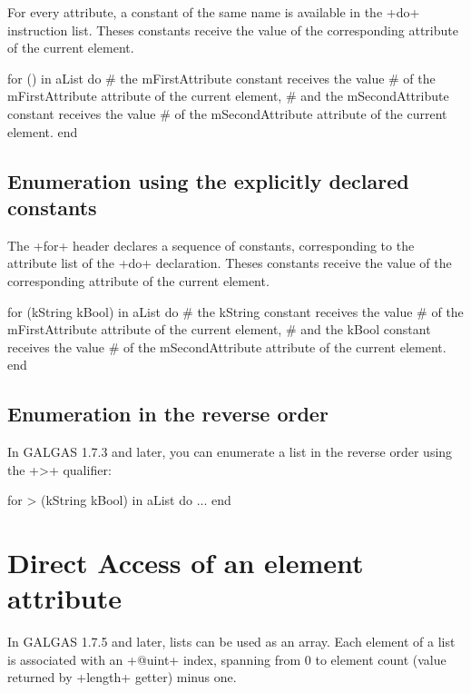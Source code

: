 For every attribute, a constant of the same name is available in the \ggs+do+ instruction list. Theses constants receive the value of the corresponding attribute of the current element.

\begin{galgas}
for () in aList do
  # the mFirstAttribute constant receives the value
  # of the mFirstAttribute attribute of the current element,
  # and the mSecondAttribute constant receives the value
  # of the mSecondAttribute attribute of the current element.
end
\end{galgas}

\subsection{Enumeration using the explicitly declared constants}

The \ggs+for+ header declares a sequence of constants, corresponding to the attribute list of the \ggs+do+ declaration. Theses constants receive the value of the corresponding attribute of the current element.


\begin{galgas}
for (kString kBool) in aList do
  # the kString constant receives the value
  # of the mFirstAttribute attribute of the current element,
  # and the kBool constant receives the value
  # of the mSecondAttribute attribute of the current element.
end
\end{galgas}

\subsection{Enumeration in the reverse order}

In GALGAS 1.7.3 and later, you can enumerate a list in the reverse order using the \ggs+>+ qualifier:

\begin{galgas}
for > (kString kBool) in aList do
  ...
end
\end{galgas}




\section{Direct Access of an element attribute}

In GALGAS 1.7.5 and later, lists can be used as an array. Each element of a list is associated with an \ggs+@uint+ index, spanning from 0 to element count (value returned by \ggs+length+ getter) minus one.


